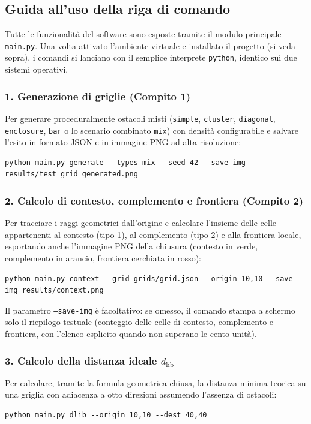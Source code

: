\subsection{Guida all'uso della riga di comando}

Tutte le funzionalità del software sono esposte tramite il modulo principale \texttt{main.py}. Una volta attivato l'ambiente virtuale e installato il progetto (si veda sopra), i comandi si lanciano con il semplice interprete \texttt{python}, identico sui due sistemi operativi.

\subsubsection{1. Generazione di griglie (Compito 1)}
Per generare proceduralmente ostacoli misti (\texttt{simple}, \texttt{cluster}, \texttt{diagonal}, \texttt{enclosure}, \texttt{bar} o lo scenario combinato \texttt{mix}) con densità configurabile e salvare l'esito in formato JSON e in immagine PNG ad alta risoluzione:
\begin{lstlisting}[style=comandoshell]
python main.py generate --types mix --seed 42 --save-img results/test_grid_generated.png
\end{lstlisting}

\subsubsection{2. Calcolo di contesto, complemento e frontiera (Compito 2)}
Per tracciare i raggi geometrici dall'origine e calcolare l'insieme delle celle appartenenti al contesto (tipo 1), al complemento (tipo 2) e alla frontiera locale, esportando anche l'immagine PNG della chiusura (contesto in verde, complemento in arancio, frontiera cerchiata in rosso):
\begin{lstlisting}[style=comandoshell]
python main.py context --grid grids/grid.json --origin 10,10 --save-img results/context.png
\end{lstlisting}
Il parametro \texttt{--save-img} è facoltativo: se omesso, il comando stampa a schermo solo il riepilogo testuale (conteggio delle celle di contesto, complemento e frontiera, con l'elenco esplicito quando non superano le cento unità).

\subsubsection{3. Calcolo della distanza ideale $d_{\text{lib}}$}
Per calcolare, tramite la formula geometrica chiusa, la distanza minima teorica su una griglia con adiacenza a otto direzioni assumendo l'assenza di ostacoli:
\begin{lstlisting}[style=comandoshell]
python main.py dlib --origin 10,10 --dest 40,40
\end{lstlisting}


